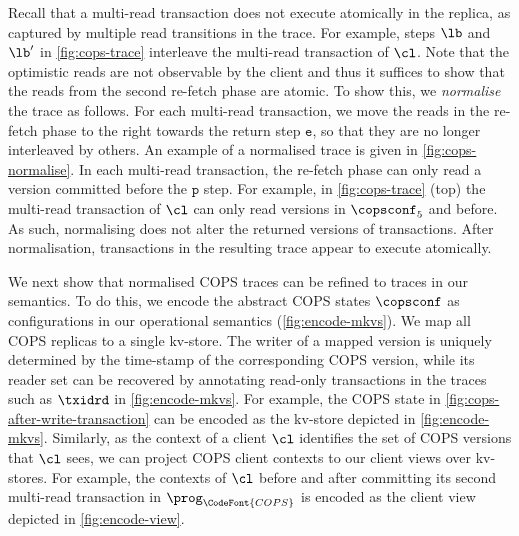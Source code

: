 

Recall that a multi-read transaction does not execute atomically in the replica,
as captured by multiple read transitions in the trace.
For example, steps \( \lb\) and \( \lb' \) in \cref{fig:cops-trace}
interleave the multi-read transaction of \( \cl \).
Note that the optimistic reads are not observable by the client and
thus it suffices to show that the reads from the second re-fetch phase are atomic.
To show this, we \emph{normalise} the trace as follows. 
For each multi-read transaction, 
we move the reads in the re-fetch phase to the right towards the return step \( \mathtt{e}\),
so that they are no longer interleaved by others.
An example of a normalised trace is given in \cref{fig:cops-normalise}.
In each multi-read transaction,
the re-fetch phase can only read a version committed before the \( \mathtt{p}\) step.
For example, in \cref{fig:cops-trace} (top)
the multi-read transaction of \( \cl \) can only read versions in \( \copsconf_5 \) and before.
As such, normalising does not alter the returned versions of transactions.
After normalisation, transactions in the resulting trace appear to execute atomically. 

We next show that normalised COPS traces can be refined to traces in our semantics.
To do this, we encode the abstract COPS states \(\copsconf \) as configurations
in our operational semantics (\cref{fig:encode-mkvs}). 
We map all COPS replicas to a single kv-store.
The writer of a mapped version is uniquely
determined by the time-stamp of the corresponding COPS version, 
while its reader set 
can be recovered by annotating read-only transactions in the traces such as \( \txidrd \) in \cref{fig:encode-mkvs}.
For example, the COPS state in \cref{fig:cops-after-write-transaction}
can be encoded as the kv-store depicted in \cref{fig:encode-mkvs}.
Similarly, as the context of a client $\cl$ identifies the set of COPS versions that $\cl$ sees, 
we can project COPS client contexts to our client views over kv-stores. 
For example, the contexts of \( \cl \) 
before and after committing its second multi-read transaction in \( \prog_{\CodeFont{COPS}} \) 
is encoded as the client view depicted in \cref{fig:encode-view}.

